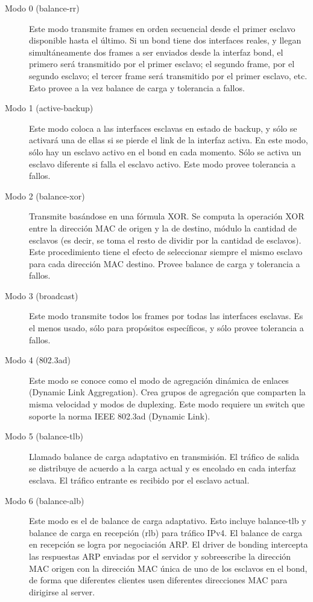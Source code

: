 \begin{description}
\item [Modo 0 (balance-rr)]
Este modo transmite frames en orden secuencial desde el primer esclavo disponible hasta el último. Si un bond tiene dos interfaces reales, y llegan simultáneamente dos frames a ser enviados desde la interfaz bond, el primero será transmitido por el primer esclavo; el segundo frame, por el segundo esclavo; el tercer frame será transmitido por el primer esclavo, etc. Esto provee a la vez balance de carga y tolerancia a fallos. 

\item [Modo 1 (active-backup)]
Este modo coloca a las interfaces esclavas en estado de backup, y sólo se activará una de ellas si se pierde el link de la interfaz activa. En este modo, sólo hay un esclavo activo en el bond en cada momento. Sólo se activa un esclavo diferente si falla el esclavo activo. Este modo provee tolerancia a fallos.

\item [Modo 2 (balance-xor)]
Transmite basándose en una fórmula XOR. Se computa la operación XOR entre la dirección MAC de origen y la de destino, módulo la cantidad de esclavos (es decir, se toma el resto de dividir por la cantidad de esclavos). Este procedimiento tiene el efecto de seleccionar siempre el mismo esclavo para cada dirección MAC destino. Provee balance de carga y tolerancia a fallos.

\item [Modo 3 (broadcast)]
Este modo transmite todos los frames por todas las interfaces esclavas. Es el menos usado, sólo para propósitos específicos, y sólo provee tolerancia a fallos. 

\item [Modo 4 (802.3ad)]
Este modo se conoce como el modo de agregación dinámica de enlaces (Dynamic Link Aggregation). Crea grupos de agregación que comparten la misma velocidad y modos de duplexing. Este modo requiere un switch que soporte la norma IEEE 802.3ad (Dynamic Link).

\item [Modo 5 (balance-tlb)]
Llamado balance de carga adaptativo en transmisión. El tráfico de salida se distribuye de acuerdo a la carga actual y es encolado en cada interfaz esclava. El tráfico entrante es recibido por el esclavo actual. 

\item [Modo 6 (balance-alb)]
Este modo es el de balance de carga adaptativo. Esto incluye balance-tlb y balance de carga en recepción (rlb) para tráfico IPv4. El balance de carga en recepción se logra por negociación ARP. El driver de bonding intercepta las respuestas ARP enviadas por el servidor y sobreescribe la dirección MAC origen con la dirección MAC única de uno de los esclavos en el bond, de forma que diferentes clientes usen diferentes direcciones MAC para dirigirse al server. 
\end{description}

